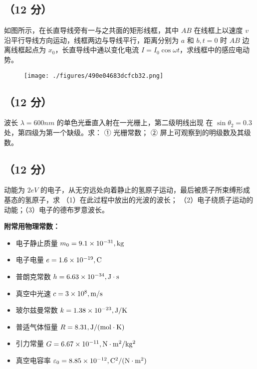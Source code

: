 \subsection{（12 分）}如图所示，在长直导线旁有一与之共面的矩形线框，其中 $AB$ 在线框上以速度 $v$ 沿平行导线方向运动，线框两边与导线平行，距离分别为 $a$ 和 $b,t=0$ 时 $AB$ 边离线框起点为 $x_0$，长直导线中通以变化电流 $I = I_0 \cos{\omega t}$，求线框中的感应电动势。
\begin{figure}[ht]
\centering
\texttt{[image: ./figures/490e04683dcfcb32.png]}
\caption{} \label{fig_NIU06_7}
\end{figure}

\subsection{（12 分）}波长 $\lambda = 600 nm$ 的单色光垂直入射在一光栅上，第二级明线出现 在 $\sin{\theta_2} = 0.3$ 处，第四级为第一个缺级。求： ① 光栅常数； ② 屏上可观察到的明级数及其级数。

\subsection{（12 分）}动能为 $2eV$ 的电子，从无穷远处向着静止的氢原子运动，最后被质子所束缚形成基态的氢原子，求 （1）在此过程中放出的光波的波长； （2）电子绕质子运动的动能；（3）电子的德布罗意波长。

\textbf{附常用物理常数：}
\begin{itemize}
    \item 电子静止质量 $m_0 = 9.1 \times 10^{-31} \\, \mathrm{kg}$
    \item 电子电量 $e = 1.6 \times 10^{-19} \\, \mathrm{C}$
    \item 普朗克常数 $h = 6.63 \times 10^{-34} \\, \mathrm{J \cdot s}$
    \item 真空中光速 $c = 3 \times 10^8 \\, \mathrm{m/s}$
    \item 玻尔兹曼常数 $k = 1.38 \times 10^{-23} \\, \mathrm{J/K}$
    \item 普适气体恒量 $R = 8.31 \\, \mathrm{J/(mol \cdot K)}$
    \item 引力常量 $G = 6.67 \times 10^{-11} \\, \mathrm{N \cdot m^2 / kg^2}$
    \item 真空电容率 $\varepsilon_0 = 8.85 \times 10^{-12} \\, \mathrm{C^2 / (N \cdot m^2)}$
\end{itemize}
